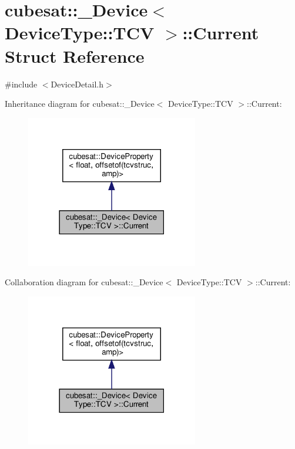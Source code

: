 \hypertarget{structcubesat_1_1__Device_3_01DeviceType_1_1TCV_01_4_1_1Current}{}\section{cubesat\+:\+:\+\_\+\+Device$<$ Device\+Type\+:\+:T\+CV $>$\+:\+:Current Struct Reference}
\label{structcubesat_1_1__Device_3_01DeviceType_1_1TCV_01_4_1_1Current}


{\ttfamily \#include $<$Device\+Detail.\+h$>$}



Inheritance diagram for cubesat\+:\+:\+\_\+\+Device$<$ Device\+Type\+:\+:T\+CV $>$\+:\+:Current\+:\nopagebreak
\begin{figure}[H]
\begin{center}
\leavevmode
\includegraphics[width=213pt]{structcubesat_1_1__Device_3_01DeviceType_1_1TCV_01_4_1_1Current__inherit__graph}
\end{center}
\end{figure}


Collaboration diagram for cubesat\+:\+:\+\_\+\+Device$<$ Device\+Type\+:\+:T\+CV $>$\+:\+:Current\+:\nopagebreak
\begin{figure}[H]
\begin{center}
\leavevmode
\includegraphics[width=213pt]{structcubesat_1_1__Device_3_01DeviceType_1_1TCV_01_4_1_1Current__coll__graph}
\end{center}
\end{figure}
